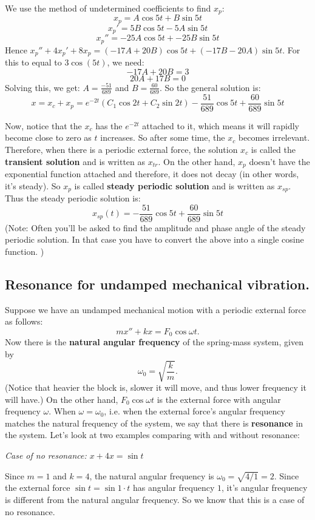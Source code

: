 \documentclass[12pt]{report}
\begin{document}
We use the method of undetermined coefficients to find $x_p$:
$$x_p = A\cos 5t + B\sin 5t$$
$$x_p'= 5B\cos 5t -5A\sin 5t$$
$$x_p'' = -25A\cos 5t + -25B\sin 5t$$
Hence $x_p''+ 4x_p'+8x_p = (-17A+20B)\cos 5t + (-17B-20A)\sin 5t$. For this to equal to $3\cos(5t)$, we need:
$$-17A+20B = 3$$
$$20A+17B=0$$
Solving this, we get: $A= \frac{-51}{689}$ and $B=\frac{60}{689}$. So the general solution is:
$$x = x_c + x_p = e^{-2t} (C_1 \cos 2t + C_2 \sin 2t) - \frac{51}{689}\cos 5t + \frac{60}{689}\sin 5t$$

Now, notice that the $x_c$ has the $e^{-2t}$ attached to it, which means it will rapidly become close to zero as $t$ increases. So after some time, the $x_c$ becomes irrelevant. Therefore, when there is a periodic external force, the solution $x_c$ is called the \textbf{transient solution} and is written as $x_{tr}$. On the other hand, $x_p$ doesn't have the exponential function attached and therefore, it does not decay (in other words, it's steady). So $x_p$ is called \textbf{steady periodic solution} and is written as $x_{sp}$.
Thus the steady periodic solution is:
$$x_{sp}(t) = - \frac{51}{689}\cos 5t + \frac{60}{689}\sin 5t$$
(Note: Often you'll be asked to find the amplitude and phase angle of the steady periodic solution. In that case you have to convert the above into a single cosine function. )

\subsection*{Resonance for undamped mechanical vibration.}

Suppose we have an undamped mechanical motion with a periodic external force as follows: 
$$mx''+kx=F_0\cos\omega t.$$
Now there is the \textbf{natural angular frequency} of the spring-mass system, given by 
$$\omega_0 = \sqrt{\frac{k}{m}}.$$
(Notice that heavier the block is, slower it will move, and thus lower frequency it will have.)
On the other hand, $F_0 \cos \omega t$ is the external force with angular frequency $\omega$.
When $\omega=\omega_0$, i.e. when the external force's angular frequency matches the natural frequency of the system, we say that there is \textbf{resonance} in the system. Let's look at two examples comparing with and without resonance:

\textit{Case of no resonance: $x+4x= \sin t$ }

Since $m=1$ and $k=4$, the natural angular frequency is $\omega_0 = \sqrt{4/1} = 2$. Since the external force $\sin t = \sin 1\cdot t$ has angular frequency $1$, it's angular frequency is different from the natural angular frequency. So we know that this is a case of no resonance. 
\end{document}

